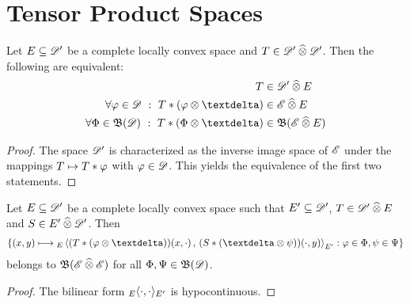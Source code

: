 \section{Tensor Product Spaces}

\begin{lemma}
    \label{lem:distepro}
    Let $ E \subseteq \mathscr{  D  }' $ be a complete locally convex space
    and $ T \in \mathscr{  D  }' \mathbin{\widehat{\otimes}} \mathscr{  D  }' $.
    Then the following are equivalent:
    \begin{subequations}
        \begin{align}
            T &\in \fsDis \ctepro E
            \\
            \forall \ph \in \fsTest
            ~:~
            T * ( \ph \tepro \sfdeo ) &\in \fsSmo \ctepro E
            \\
            \forall \Ph \in \ssBnd(\fsTest)
            ~:~
            T * ( \Ph \tepro \sfdeo ) &\in \ssBnd( \fsSmo \ctepro E )
        \end{align}
    \end{subequations}
\end{lemma}
\begin{proof}
    The space $ \mathscr{  D  }' $ is characterized
    as the inverse image space of $ \mathscr{  E  } $
    under the mappings $ T \mapsto T * \varphi $
    with $ \varphi \in \mathscr{  D  } $.
    This yields the equivalence of the first two statements.
\end{proof}

\begin{lemma}
    \label{lem:jo}
    Let $ E \subseteq \mathscr{  D  }' $ be a complete locally convex space
    such that $ E' \subseteq \mathscr{  D  }' $,
    $ T \in \mathscr{  D  }' \mathbin{\widehat{\otimes}} E $ and $ S \in E' \mathbin{\widehat{\otimes}} \mathscr{  D  }' $.
    Then
    \begin{align}
        \BrmSet{
        (x,y)
        \Mto
        {}_E\Ska{ ( T * ( \ph \tepro \sfdeo ) )(x,\cdot) }
            { ( S * ( \sfdeo \tepro \ps ) )(\cdot,y) }_{E'}
        }
        { \ph \in \Ph, \ps \in \Ps }
        \label{eq:lem:jo}
    \end{align}
    belongs to $ \operatorname{\mathfrak{ B }}( \mathscr{  E  } \mathbin{\widehat{\otimes}} \mathscr{  E  } ) $
    for all $ \Phi,\Psi \in \operatorname{\mathfrak{ B }}(\mathscr{  D  }) $.
\end{lemma}
\begin{proof}
    The bilinear form $ {}_E\langle  \cdot  ,  \cdot  \rangle_{E'} $ is hypocontinuous.
\end{proof}




